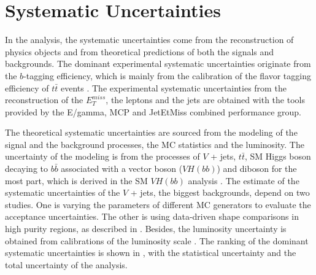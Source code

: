 \documentclass[class=NTHU_thesis, crop=false]{standalone}
\begin{document}
\chapter{Systematic Uncertainties}
\label{chap:systematic_uncertainties}
In the analysis, the systematic uncertainties come from the reconstruction of physics objects and from theoretical predictions of both the signals and backgrounds. The dominant experimental systematic uncertainties originate from the $b$-tagging efficiency, which is mainly from the calibration of the flavor tagging efficiency of $t\bar{t}$ events \cite{ATL-PHYS-PUB-2017-013}. The experimental systematic uncertainties from the reconstruction of the $E^{miss}_T$, the leptons and the jets are obtained with the tools provided by the E/gamma, MCP and JetEtMiss combined performance group.

The theoretical systematic uncertainties are sourced from the modeling of the signal and the background processes, the MC statistics and the luminosity. The uncertainty of the modeling is from the processes of $V$ + jets, $t\bar{t}$, SM Higgs boson decaying to $b\bar{b}$ associated with a vector boson ($VH(bb)$) and diboson for the most part, which is derived in the SM $VH(bb)$ analysis \cite{Aaboud2017}. The estimate of the systematic uncertainties of the $V$ + jets, the biggest backgrounds, depend on two studies. One is varying the parameters of different MC generators to evaluate the acceptance uncertainties. The other is using data-driven shape comparisons in high purity regions, as described in . Besides, the luminosity uncertainty is obtained from calibrations of the luminosity scale \cite{Aaboud2016}. The ranking of the dominant systematic uncertainties is shown in , with the statistical uncertainty and the total uncertainty of the analysis.
\end{document}
